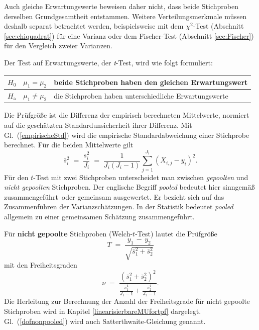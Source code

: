 Auch gleiche Erwartungswerte beweisen daher nicht, dass beide Stichproben derselben
Grundgesamtheit entstammen. Weitere Verteilungsmerkmale müssen deshalb separat
betrachtet werden, beispielsweise mit dem $\chi^2$-Test (Abschnitt \ref{sec:chiquadrat}) für eine Varianz oder dem Fischer-Test (Abschnitt \ref{sec:Fischer}) für den Vergleich zweier Varianzen.

Der Test auf Erwartungswerte, der \textsl{t}-Test, wird wie folgt formuliert:
\begin{center}
\setlength{\extrarowheight}{.5em}
\begin{tabular}{c|cl}
$H_0$ & $\mu_1 = \mu_2$ & beide Stichproben haben den gleichen Erwartungswert\\
\hline
$H_\mathrm{a}$ & $\mu_1 \neq \mu_2$ & die Stichproben haben unterschiedliche Erwartungswerte
\end{tabular}
\end{center}

Die Prüfgröße ist die Differenz der empirisch berechneten Mittelwerte, normiert auf die
geschätzten Standardunsicherheit ihrer Differenz. Mit Gl.~(\ref{empirischeStd}) wird die
empirische Standardabweichung einer Stichprobe berechnet. Für die beiden Mittelwerte gilt
\begin{equation}
\bar s_i^2 \; = \; \frac{s_i^2}{J_i}
 \; = \; \frac{1}{J_i(J_i-1)}\sum_{j=1}^{J_i}(X_{i,j}-y_i)^2.
\end{equation}
Für den $t$-Test mit zwei Stichproben unterscheidet man zwischen \textsl{gepoolten} und
\textsl{nicht gepoolten} Stichproben. Der englische Begriff \textsl{pooled} bedeutet hier sinngemäß \glqq zusammengeführt\grqq ~oder \glqq gemeinsam ausgewertet\grqq. Er bezieht sich auf das Zusammenführen der Varianzschätzungen. In der Statistik bedeutet \textsl{pooled} allgemein \glqq zu einer gemeinsamen Schätzung zusammengeführt\grqq.

Für \textbf{nicht gepoolte} Stichproben (Welch-$t$-Test) lautet die Prüfgröße
\begin{equation}
T \; = \; \frac{y_1 \, - \, y_2}{\sqrt{\bar s_1^2 + \bar s_2^2}}
\label{tTestWelch}
\end{equation}
mit den Freiheitsgraden 
\begin{equation}
\nu \; = \;
 \frac{ \left(\bar s_1^2 +\bar s_2^2\right)^2}{
  \frac{\bar s_1^4}{J_1 - 1} + \frac{\bar s_2^4}{J_2 - 1} } .
\label{dofnonpooled}
\end{equation}
Die Herleitung zur Berechnung der Anzahl der Freiheitsgrade für nicht gepoolte Stichproben
wird in Kapitel \ref{linearisierbareMUfortpf} dargelegt. Gl.~(\ref{dofnonpooled}) wird auch
Satterthwaite-Gleichung genannt.

